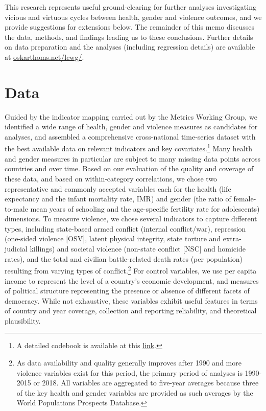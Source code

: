 \documentclass[12pt]{article}
\begin{document}
This research represents useful ground-clearing for further analyses investigating vicious and virtuous cycles between health, gender and violence outcomes, and we provide suggestions for extensions below.
The remainder of this memo discusses the data, methods, and findings leading us to these conclusions. Further details on data preparation and the analyses (including regression details) are available at \href{oskarthoms.net/lcwg/}{oskarthoms.net/lcwg/}.

\section{Data}

Guided by the indicator mapping carried out by the Metrics Working Group, we identified a wide range of health, gender and violence measures as candidates for analyses, and assembled a comprehensive cross-national time-series dataset with the best available data on relevant indicators and key covariates.\footnote{A detailed codebook is available at this \href{https://docs.google.com/spreadsheets/d/1KLFTva--XHVBM-IX6qaPtuyzmIlRMnpyjUXfBdJPsag/edit?usp=sharing}{link}.} Many health and gender measures in particular are subject to many missing data points across countries and over time.
Based on our evaluation of the quality and coverage of these data, and based on within-category correlations, we chose two representative and commonly accepted variables each for the health (life expectancy and the infant mortality rate, IMR) and gender (the ratio of female-to-male mean years of schooling and the age-specific fertility rate for adolescents) dimensions.
To measure violence, we chose several indicators to capture different types, including state-based armed conflict (internal conflict/war), repression (one-sided violence [OSV], latent physical integrity, state torture and extra-judicial killings) and societal violence (non-state conflict [NSC] and homicide rates), and the total and civilian battle-related death rates (per population) resulting from varying types of conflict.\footnote{As data availability and quality generally improves after 1990 and more violence variables exist for this period, the primary period of analyses is 1990-2015 or 2018. All variables are aggregated to five-year averages because three of the key health and gender variables are provided as such averages by the World Populations Prospects Database.}
For control variables, we use per capita income to represent the level of a country's economic development, and measures of political structure representing the presence or absence of different facets of democracy.
While not exhaustive, these variables exhibit useful features in terms of country and year coverage, collection and reporting reliability, and theoretical plausibility.
\end{document}

